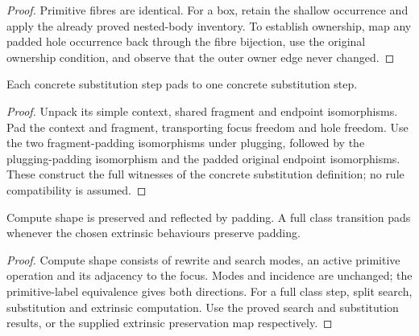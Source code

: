 \begin{proof}
Primitive fibres are identical. For a box, retain the shallow occurrence and apply the already proved nested-body inventory. To establish ownership, map any padded hole occurrence back through the fibre bijection, use the original ownership condition, and observe that the outer owner edge never changed.
\end{proof}




\begin{lemma}
Each concrete substitution step pads to one concrete substitution step.
\end{lemma}

\begin{proof}
Unpack its simple context, shared fragment and endpoint isomorphisms. Pad the context and fragment, transporting focus freedom and hole freedom. Use the two fragment-padding isomorphisms under plugging, followed by the plugging-padding isomorphism and the padded original endpoint isomorphisms. These construct the full witnesses of the concrete substitution definition; no rule compatibility is assumed.
\end{proof}



\begin{lemma}
Compute shape is preserved and reflected by padding. A full class transition pads whenever the chosen extrinsic behaviours preserve padding.
\end{lemma}

\begin{proof}
Compute shape consists of rewrite and search modes, an active primitive operation and its adjacency to the focus. Modes and incidence are unchanged; the primitive-label equivalence gives both directions. For a full class step, split search, substitution and extrinsic computation. Use the proved search and substitution results, or the supplied extrinsic preservation map respectively.
\end{proof}


